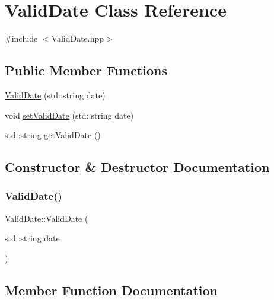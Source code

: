 \hypertarget{class_valid_date}{}\section{Valid\+Date Class Reference}
\label{class_valid_date}


{\ttfamily \#include $<$Valid\+Date.\+hpp$>$}

\subsection*{Public Member Functions}
\begin{DoxyCompactItemize}
\item 
\mbox{\hyperlink{class_valid_date_a89bfeb8a5de9370f85df8b3fbd1fafb5}{Valid\+Date}} (std\+::string date)
\item 
void \mbox{\hyperlink{class_valid_date_a28905a1bdaa71556225b7e565735364c}{set\+Valid\+Date}} (std\+::string date)
\item 
std\+::string \mbox{\hyperlink{class_valid_date_af36a9512928582cadeb618e336f7669b}{get\+Valid\+Date}} ()
\end{DoxyCompactItemize}


\subsection{Constructor \& Destructor Documentation}
\mbox{\label{class_valid_date_a89bfeb8a5de9370f85df8b3fbd1fafb5}} 
\subsubsection{\texorpdfstring{ValidDate()}{ValidDate()}}
{\footnotesize\ttfamily Valid\+Date\+::\+Valid\+Date (\begin{DoxyParamCaption}\item[{std\+::string}]{date }\end{DoxyParamCaption})}



\subsection{Member Function Documentation}
\mbox{\label{class_valid_date_af36a9512928582cadeb618e336f7669b}} 

